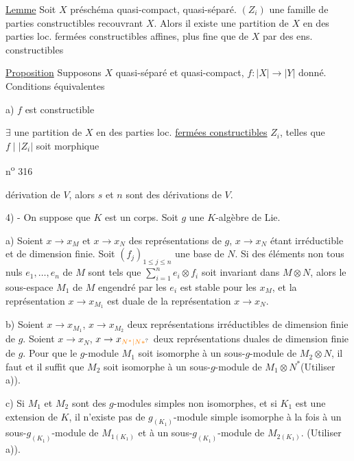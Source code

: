 \uline{Lemme} Soit $X$ préschéma quasi-compact, quasi-séparé.  $(Z_i)$ une famille  de parties constructibles recouvrant $X$. Alors il existe une partition de $X$ en des parties loc. fermées constructibles affines, plus fine que   \uline{} de $X$ par des ens. constructibles

\uline{Proposition} Supposons $X$ quasi-séparé et quasi-compact, $f:|X|\to|Y|$ donné. Conditions équivalentes

a) $f$ est constructible

 $\exists$ une partition  de $X$ en des parties loc. \uline{fermées constructibles}  $Z_i$, telles que $f\mid |Z_i|$ soit morphique



\hfill n\textsuperscript{o} 316

dérivation de $V$, alors $s$ et $n$ sont des dérivations de $V$.

4) - On suppose que $K$ est un corps. Soit $g$ une $K$-algèbre de Lie.

a) Soient $x\longrightarrow x_M$ et $x\longrightarrow x_N$ des représentations de $g$, $x\longrightarrow x_N$ étant irréductible et de dimension finie. Soit $(f_j)_{1\leq j\leq n}$ une base de $N$. Si des éléments non tous nuls $e_1,\ldots,e_n$ de $M$ sont tels que $\sum_{i=1}^{n}e_i\otimes f_i$ soit invariant dans $M\otimes N$, alors le sous-espace $M_1$ de $M$ engendré par les $e_i$ est stable pour les $x_M$, et la représentation $x\longrightarrow x_{M_1}$ est duale de la représentation $x\longrightarrow x_N$.

b) Soient $x\longrightarrow x_{M_1}$, $x\longrightarrow x_{M_2}$ deux représentations irréductibles de dimension finie de $g$. Soient $x\to x_N$, $x\to x_{\unsure{N^*|N*}}$ deux représentations duales de dimension finie\unsure{,|{}} de $g$. Pour que le $g$-module $M_1$ soit isomorphe à un sous-$g$-module de $M_2\otimes N$, il faut et il suffit que $M_2$ soit isomorphe à un sous-$g$-module de $M_1\otimes N^*$(Utiliser a)).

c) Si $M_1$ et $M_2$ sont des $g$-modules simples non isomorphes, et si $K_1$ est une extension de $K$, il n'existe pas de $g_{(K_1)}$-module simple isomorphe à la fois à un sous-$g_{(K_1)}$-module de $M_{1(K_1)}$ et à un sous-$g_{(K_1)}$-module de $M_{2(K_1)}$. (Utiliser a)).

